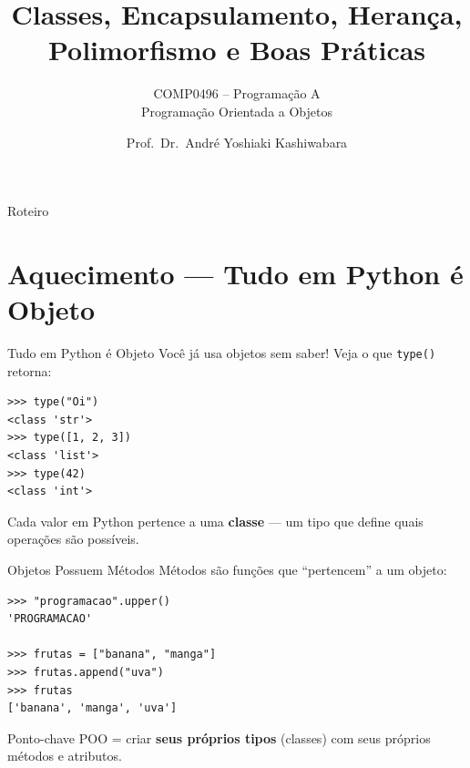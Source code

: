 \documentclass[aspectratio=169]{beamer}
\subtitle{COMP0496 -- Programação A \\ Programação Orientada a Objetos}
\title{Classes, Encapsulamento, Herança, Polimorfismo e Boas Práticas}
\author{Prof.\ Dr.\ André Yoshiaki Kashiwabara}
\begin{document}
\begin{frame}
  \titlepage
\end{frame}

\begin{frame}[shrink=40]{Roteiro}
  \tableofcontents
\end{frame}


\section{Aquecimento --- Tudo em Python é Objeto}

\begin{frame}[fragile]{Tudo em Python é Objeto}
  Você já usa objetos sem saber! Veja o que \texttt{type()} retorna:

  \begin{lstlisting}
>>> type("Oi")
<class 'str'>
>>> type([1, 2, 3])
<class 'list'>
>>> type(42)
<class 'int'>
  \end{lstlisting}

  \vspace{0.3cm}
  Cada valor em Python pertence a uma \textbf{classe} --- um tipo que define
  quais operações são possíveis.
\end{frame}

\begin{frame}[fragile]{Objetos Possuem Métodos}
  Métodos são funções que ``pertencem'' a um objeto:

  \begin{lstlisting}
>>> "programacao".upper()
'PROGRAMACAO'

>>> frutas = ["banana", "manga"]
>>> frutas.append("uva")
>>> frutas
['banana', 'manga', 'uva']
  \end{lstlisting}

  \vspace{0.3cm}
  \begin{block}{Ponto-chave}
    POO = criar \textbf{seus próprios tipos} (classes)
    com seus próprios métodos e atributos.
  \end{block}
\end{frame}
\end{document}
